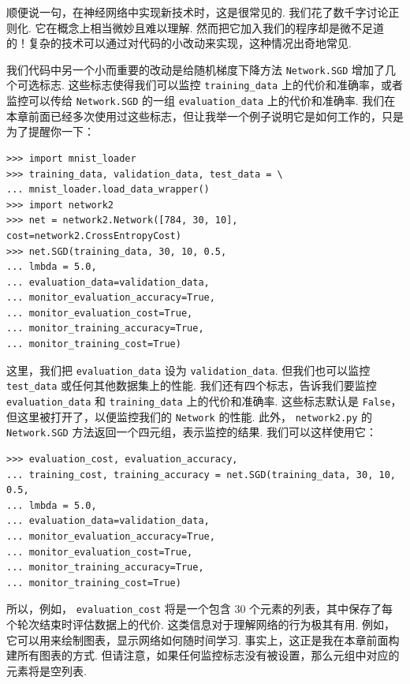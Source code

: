 顺便说一句，在神经网络中实现新技术时，这是很常见的. 我们花了数千字讨论正则化. 它在概念上相当微妙且难以理解. 然而把它加入我们的程序却是微不足道的！复杂的技术可以通过对代码的小改动来实现，这种情况出奇地常见.

我们代码中另一个小而重要的改动是给随机梯度下降方法 \texttt{Network.SGD} 增加了几个可选标志. 这些标志使得我们可以监控 \texttt{training\_\allowbreak{}data} 上的代价和准确率，或者监控可以传给 \texttt{Network.SGD} 的一组 \texttt{evaluation\_\allowbreak{}data} 上的代价和准确率. 我们在本章前面已经多次使用过这些标志，但让我举一个例子说明它是如何工作的，只是为了提醒你一下：

\begin{lstlisting}
>>> import mnist_loader
>>> training_data, validation_data, test_data = \
... mnist_loader.load_data_wrapper()
>>> import network2
>>> net = network2.Network([784, 30, 10], cost=network2.CrossEntropyCost)
>>> net.SGD(training_data, 30, 10, 0.5,
... lmbda = 5.0,
... evaluation_data=validation_data,
... monitor_evaluation_accuracy=True,
... monitor_evaluation_cost=True,
... monitor_training_accuracy=True,
... monitor_training_cost=True)

\end{lstlisting}

这里，我们把 \texttt{evaluation\_\allowbreak{}data} 设为 \texttt{validation\_\allowbreak{}data}. 但我们也可以监控 \texttt{test\_\allowbreak{}data} 或任何其他数据集上的性能. 我们还有四个标志，告诉我们要监控 \texttt{evaluation\_\allowbreak{}data} 和 \texttt{training\_\allowbreak{}data} 上的代价和准确率. 这些标志默认是 \texttt{False}，但这里被打开了，以便监控我们的 \texttt{Network} 的性能. 此外， \texttt{network2.py} 的 \texttt{Network.SGD} 方法返回一个四元组，表示监控的结果. 我们可以这样使用它：

\begin{lstlisting}
>>> evaluation_cost, evaluation_accuracy,
... training_cost, training_accuracy = net.SGD(training_data, 30, 10, 0.5,
... lmbda = 5.0,
... evaluation_data=validation_data,
... monitor_evaluation_accuracy=True,
... monitor_evaluation_cost=True,
... monitor_training_accuracy=True,
... monitor_training_cost=True)

\end{lstlisting}

所以，例如， \texttt{evaluation\_\allowbreak{}cost} 将是一个包含 30 个元素的列表，其中保存了每个轮次结束时评估数据上的代价. 这类信息对于理解网络的行为极其有用. 例如，它可以用来绘制图表，显示网络如何随时间学习. 事实上，这正是我在本章前面构建所有图表的方式. 但请注意，如果任何监控标志没有被设置，那么元组中对应的元素将是空列表.

